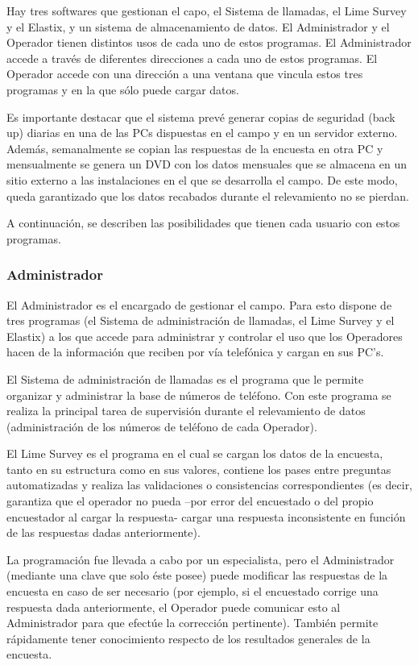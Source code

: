 \documentclass[
  openany]{book}
\begin{document}
Hay tres softwares que gestionan el capo, el Sistema de llamadas, el Lime Survey y el Elastix, y un sistema de almacenamiento de datos. El Administrador y el Operador tienen distintos usos de cada uno de estos programas. El Administrador accede a través de diferentes direcciones a cada uno de estos programas. El Operador accede con una dirección a una ventana que vincula estos tres programas y en la que sólo puede cargar datos.

Es importante destacar que el sistema prevé generar copias de seguridad (back up) diarias en una de las PCs dispuestas en el campo y en un servidor externo. Además, semanalmente se copian las respuestas de la encuesta en otra PC y mensualmente se genera un DVD con los datos mensuales que se almacena en un sitio externo a las instalaciones en el que se desarrolla el campo. De este modo, queda garantizado que los datos recabados durante el relevamiento no se pierdan.

A continuación, se describen las posibilidades que tienen cada usuario con estos programas.

\hypertarget{administrador}{%
\subsubsection{Administrador}\label{administrador}}

El Administrador es el encargado de gestionar el campo. Para esto dispone de tres programas (el Sistema de administración de llamadas, el Lime Survey y el Elastix) a los que accede para administrar y controlar el uso que los Operadores hacen de la información que reciben por vía telefónica y cargan en sus PC's.

El Sistema de administración de llamadas es el programa que le permite organizar y administrar la base de números de teléfono. Con este programa se realiza la principal tarea de supervisión durante el relevamiento de datos (administración de los números de teléfono de cada Operador).

El Lime Survey es el programa en el cual se cargan los datos de la encuesta, tanto en su estructura como en sus valores, contiene los pases entre preguntas automatizadas y realiza las validaciones o consistencias correspondientes (es decir, garantiza que el operador no pueda --por error del encuestado o del propio encuestador al cargar la respuesta- cargar una respuesta inconsistente en función de las respuestas dadas anteriormente).

La programación fue llevada a cabo por un especialista, pero el Administrador (mediante una clave que solo éste posee) puede modificar las respuestas de la encuesta en caso de ser necesario (por ejemplo, si el encuestado corrige una respuesta dada anteriormente, el Operador puede comunicar esto al Administrador para que efectúe la corrección pertinente). También permite rápidamente tener conocimiento respecto de los resultados generales de la encuesta.
\end{document}

